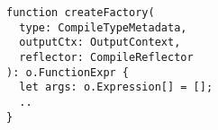 \begin{verbatim}
function createFactory(
  type: CompileTypeMetadata,
  outputCtx: OutputContext,
  reflector: CompileReflector
): o.FunctionExpr {
  let args: o.Expression[] = [];
  ..
}
\end{verbatim}
